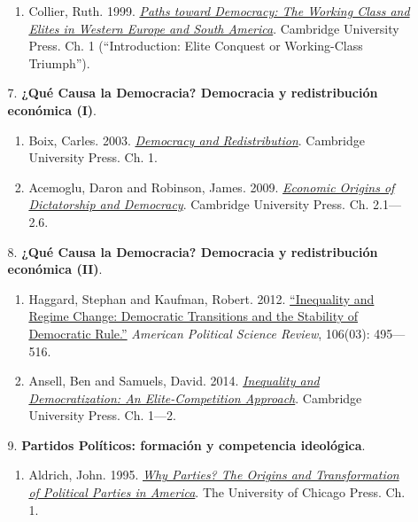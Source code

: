 \documentclass[letterpaper]{article}
\begin{document}
\begin{enumerate}
\begin{enumerate}
\begin{enumerate}
						\item Collier, Ruth. 1999. \href{https://github.com/hbahamonde/Ciencia_Politica_I/raw/master/Readings/Collier.pdf}{\emph{Paths toward Democracy: The Working Class and Elites in Western Europe and South America}}. Cambridge University Press. Ch. 1 (``Introduction: Elite Conquest or Working-Class Triumph'').
					\end{enumerate}

				\item[7.] {\bf ¿Qu\'e Causa la Democracia? Democracia y redistribuci\'on econ\'omica (I)}.  
					\begin{enumerate}
						\item Boix, Carles. 2003. \href{https://github.com/hbahamonde/Ciencia_Politica_I/raw/master/Readings/Boix_2003.pdf}{\emph{Democracy and Redistribution}}. Cambridge University Press. Ch. 1.

						\item Acemoglu, Daron and Robinson, James. 2009. \href{https://github.com/hbahamonde/Ciencia_Politica_I/raw/master/Readings/Acemoglu_Robinson.pdf}{\emph{Economic Origins of Dictatorship and Democracy}}. Cambridge University Press. Ch. 2.1---2.6.
					\end{enumerate}


				\item[8.] {\bf ¿Qu\'e Causa la Democracia? Democracia y redistribuci\'on econ\'omica (II)}.  
					\begin{enumerate}
						\item Haggard, Stephan and Kaufman, Robert. 2012. \href{https://github.com/hbahamonde/Ciencia_Politica_I/raw/master/Readings/Haggard_Kaufman.pdf}{``Inequality and Regime Change: Democratic Transitions and the Stability of Democratic Rule.''} \emph{American Political Science Review}, 106(03): 495---516.

						\item Ansell, Ben and Samuels, David. 2014. \href{https://github.com/hbahamonde/Ciencia_Politica_I/raw/master/Readings/Ansell_Samuels.pdf}{\emph{Inequality and Democratization: An Elite-Competition Approach}}. Cambridge University Press. Ch. 1---2.
					\end{enumerate}

				\item[9.] {\bf Partidos Pol\'iticos: formaci\'on y competencia ideol\'ogica}.
					\begin{enumerate}
						\item Aldrich, John. 1995. \href{https://github.com/hbahamonde/Ciencia_Politica_I/raw/master/Readings/Aldrich_1995.pdf}{\emph{Why Parties? The Origins and Transformation of Political Parties in America}}. The University of Chicago Press. Ch. 1.
						

\end{enumerate}
\end{enumerate}
\end{enumerate}
\end{document}
